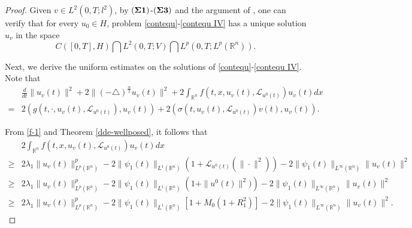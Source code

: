 \documentclass[11pt]{article}
\numberwithin{equation}{section}
\theoremstyle{plain}
\def\geq{\geqslant}
\begin{document}
\begin{proof}
   Given $v\in L^2(0,T; l^2)$,
   by
      $({\bf \Sigma 1})$-$({\bf \Sigma 3})$
      and the argument of   \cite{wangb2019JDE},
      one can verify  that
      for every
      $u_0\in H$,
       problem \eqref{contequ}-\eqref{contequ IV} has a unique solution
 $u_v$ in the space
    $$C([0,T], H) \bigcap L^2(0,T; V) \bigcap L^p(0,T; L^p(\mathbb{R}^n)).$$




    Next, we derive
     the uniform  estimates on
     the
     solutions
      of \eqref{contequ}-\eqref{contequ IV}. Note that
   \begin{align}\label{ceue-1}
     & \frac{d}{dt} \| u_v(t) \|^2
        + 2 \| (-\triangle)^{\frac{\alpha}{2}} u_v(t) \|^2
        + 2 \int_{\mathbb{R}^n} f(t, x, u_v(t), \mathcal{L}_{u^0(t)} ) u_v(t) dx
          \nonumber \\
   = & 2
         \left( g(t, \cdot, u_v(t), \mathcal{L}_{u^0(t)} ),
                u_v(t)
         \right)
       + 2 \left( \sigma(t, u_v(t), \mathcal{L}_{u^0(t)} ) v(t),
                  u_v(t)
           \right).
\end{align}

From \eqref{f-1} and Theorem \ref{dde-wellposed}, it follows that
\begin{align}\label{ceue-2}
        & 2 \int_{\mathbb{R}^n} f(t, x, u_v(t), \mathcal{L}_{u^0(t)} ) u_v(t) dx
          \nonumber \\
   \geq &  2 \lambda_1 \| u_v(t) \|_{L^p(\mathbb{R}^n)}^{p}
           - 2 \| \psi_{1}(t) \|_{L^1(\mathbb{R}^n)}
               \left( 1 + \mathcal{L}_{u^0(t)} (\|\cdot\|^2) \right)
               -2 \| \psi_1 (t)\|
               _{L^\infty (\mathbb{R}^n)}
               \| u_v(t) \|^2
                 \nonumber \\
   \geq &  2 \lambda_1 \| u_v(t) \|_{L^p(\mathbb{R}^n)}^{p}
           - 2 \| \psi_{1}(t) \|_{L^1(\mathbb{R}^n)}
               \left( 1 + \| u^0(t) \|^2) \right)
                -2 \| \psi_1 (t)\|
               _{L^\infty (\mathbb{R}^n)}
               \| u_v(t) \|^2
                 \nonumber \\
   \geq &  2 \lambda_1 \| u_v(t) \|_{L^p(\mathbb{R}^n)}^{p}
           - 2 \| \psi_{1}(t) \|_{L^1(\mathbb{R}^n)}
               \left[ 1 + M_0( 1 + R_1^2 ) \right]
                -2 \| \psi_1 (t)\|
               _{L^\infty (\mathbb{R}^n)}
               \| u_v(t) \|^2.
\end{align}


\end{proof}
\end{document}
